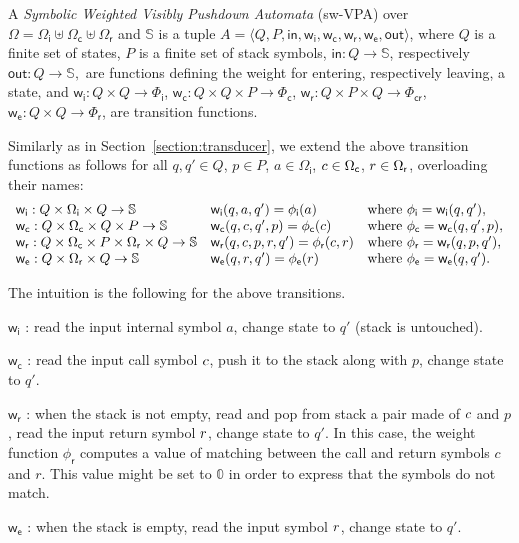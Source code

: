 \documentclass[runningheads]{llncs}
\def\<#1>{\langle #1 \rangle}
\newcommand{\Semiring}{\mathbb{S}}
\newcommand{\zero}{\mathbb{0}}
\def\SWVPA{\textsf{sw-VPA}\xspace}
\def\wei{\mathsf{w}}
\def\init{\mathsf{in}}
\def\final{\mathsf{out}}
\newcommand{\call}[1]{\ensuremath #1} %
\newcommand{\return}[1]{\ensuremath #1} %
\def\Omegai{{\Omega_\mathsf{i}}}
\def\Omegac{{\Omega_\mathsf{c}}}
\def\Omegar{{\Omega_\mathsf{r}}}
\def\Phii{{\Phi_\mathsf{i}}}
\def\Phic{{\Phi_\mathsf{c}}}
\def\Phir{{\Phi_\mathsf{r}}}
\def\Phicr{{\Phi_\mathsf{cr}}}
\def\weii{{\wei_\mathsf{i}}}
\def\weic{{\wei_\mathsf{c}}}
\def\weir{{\wei_\mathsf{r}}}
\def\weie{{\wei_\mathsf{e}}}
\begin{document}
\begin{definition}
A \emph{Symbolic Weighted Visibly Pushdown Automata} (\SWVPA) 
over  $\Omega = \Omegai \uplus \Omegac \uplus \Omegar$ and $\Semiring$ is a tuple
$A = \< Q, P, \init, \weii, \weic, \weir, \weie, \final >$,
where $Q$ is a finite set of states, 
$P$ is a finite set of stack symbols, 
$\mathsf{in} : Q \to \Semiring$, 
respectively $\mathsf{out} : Q \to \Semiring,$
are functions defining the weight for entering, 
respectively leaving, a state, 
and 
$\weii : Q \times Q \to \Phii$,  
$\weic : Q \times Q \times P \to \Phic$,  
$\weir : Q \times P \times Q \to \Phicr$,  
$\weie : Q \times Q \to \Phir$,  
are transition functions.
\end{definition}
%
Similarly as in Section~\ref{section:transducer}, 
we extend the above transition functions as follows
for all $q, q' \in Q$, $p \in P$, 
$a \in \Omegai$, 
$\call{c} \in \Omegac$, 
$\return{r} \in \Omegar$, 
overloading their names: %
\[
\begin{array}{lll}
\weii: Q \times \Omegai \times Q \to \Semiring & 
\weii(q, a, q') = \phi_\mathsf{i}(a) & 
\mathrm{where~} \phi_\mathsf{i} = \weii(q, q'),\\
%
\weic: Q \times \Omegac \times Q \times P \to \Semiring & 
\weic(q, \call{c}, q', p) = \phi_\mathsf{c}(\call{c}) & 
\mathrm{where~} \phi_\mathsf{c} = \weic(q, q', p),\\
%
\weir: Q \times \Omegac \times P \times \Omegar \times Q \to \Semiring & 
\weir(q, {\call{c}},  p, {\return{r}}, q') = \phi_\mathsf{r}({\call{c}},  {\return{r}}) & 
\mathrm{where~} \phi_\mathsf{r} = \weir(q, p, q'),\\
%
\weie: Q \times \Omegar \times Q \to \Semiring & 
\weie(q, {\return{r}}, q') = \phi_\mathsf{e}({\return{r}}) &
\mathrm{where~} \phi_\mathsf{e} = \weie(q, q').\\
\end{array}      
\]

\noindent
The intuition is the following for the above transitions.
\begin{description}
\item $\weii$ : read the input internal symbol $a$, change state to $q'$ (stack is untouched).
\item $\weic$ : read the input call symbol $\call{c}$, push it to the stack along with $p$, change state to $q'$.
\item $\weir$ : when the stack is not empty, 
      read and pop from stack a pair made of $\call{c}$ and $p$, 
      read the input return symbol $\return{r}$, change state to $q'$.
      In this case, the weight function $\phi_\mathsf{r}$ 
      computes a value of matching between the call and return symbols $c$ and $r$.
      This value might be set to $\zero$ in order to express that the symbols do not match.
\item $\weie$ : when the stack is empty, 
      read the input symbol $\call{r}$, change state to $q'$.
\end{description}
\end{document}
